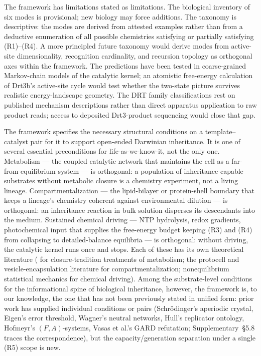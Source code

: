 \documentclass[aps,prx,reprint,amsmath,amssymb,floatfix,superscriptaddress,nofootinbib]{revtex4-2}
\theoremstyle{plain-thm}
\theoremstyle{definition-thm}
\begin{document}
The framework has limitations stated as limitations. The biological inventory of six modes is provisional; new biology may force additions. The taxonomy is descriptive: the modes are derived from attested examples rather than from a deductive enumeration of all possible chemistries satisfying or partially satisfying (R1)--(R4). A more principled future taxonomy would derive modes from active-site dimensionality, recognition cardinality, and recursion topology as orthogonal axes within the framework. The predictions have been tested in coarse-grained Markov-chain models of the catalytic kernel; an atomistic free-energy calculation of Drt3b's active-site cycle would test whether the two-state picture survives realistic energy-landscape geometry. The DRT family classifications rest on published mechanism descriptions rather than direct apparatus application to raw product reads; access to deposited Drt3-product sequencing would close that gap.

The framework specifies the necessary structural conditions on a template--catalyst pair for it to support open-ended Darwinian inheritance. It is one of several essential preconditions for life-as-we-know-it, not the only one. Metabolism --- the coupled catalytic network that maintains the cell as a far-from-equilibrium system --- is orthogonal: a population of inheritance-capable substrates without metabolic closure is a chemistry experiment, not a living lineage. Compartmentalization --- the lipid-bilayer or protein-shell boundary that keeps a lineage's chemistry coherent against environmental dilution --- is orthogonal: an inheritance reaction in bulk solution disperses its descendants into the medium. Sustained chemical driving --- NTP hydrolysis, redox gradients, photochemical input that supplies the free-energy budget keeping (R3) and (R4) from collapsing to detailed-balance equilibria --- is orthogonal: without driving, the catalytic kernel runs once and stops. Each of these has its own theoretical literature (\citealt{Pross2011, MaturanaVarela1972, Hofmeyr2017} for closure-tradition treatments of metabolism; the protocell and vesicle-encapsulation literature for compartmentalization; nonequilibrium statistical mechanics for chemical driving). Among the substrate-level conditions for the informational spine of biological inheritance, however, the framework is, to our knowledge, the one that has not been previously stated in unified form: prior work has supplied individual conditions or pairs (Schr\"odinger's aperiodic crystal, Eigen's error threshold, Wagner's neutral networks, Hull's replicator ontology, Hofmeyr's $(F, A)$-systems, Vasas et al.'s GARD refutation; Supplementary~\S5.8 traces the correspondence), but the capacity/generation separation under a single (R5) scope is new.
\end{document}
